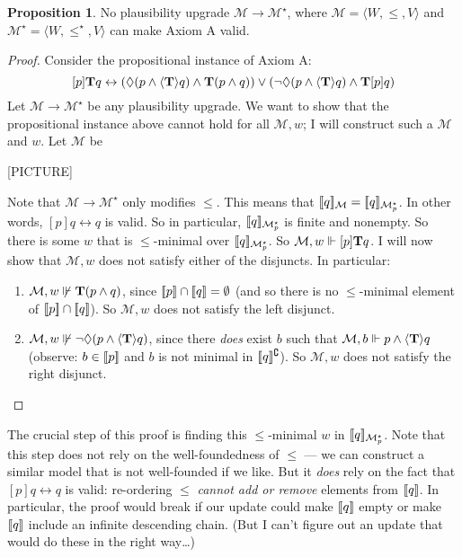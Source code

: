 \documentclass[letterpaper]{article}
\theoremstyle{definition}
\newtheorem{proposition}{Proposition}
\newcommand{\semantics}[1]{[\![\mbox{\em $ #1 $\/}]\!]}
\newcommand{\Model}{\mathcal{M}}
\newcommand{\Typ}[1]{\textrm{\textup{\textbf{T}}} #1}
\newcommand{\Update}[1]{[#1]}
\newcommand{\diaTyp}[1]{\langle \textrm{\textup{\textbf{T}}} \rangle #1}
\begin{document}
\begin{proposition}
    No plausibility upgrade $\Model \to \Model^\star$,  where $\Model = \langle W, \leq, V \rangle$ and $\Model^\star = \langle W, \leq^\star, V \rangle$ can make Axiom A valid.
\end{proposition}
\begin{proof}
    Consider the propositional instance of Axiom A:
    \[
        \Update{p} \Typ{q} \leftrightarrow 
        (\Diamond(p \land \diaTyp{q}) \land \Typ{(p \land q)}) \lor (\neg \Diamond(p \land \diaTyp{q}) \land \Typ{\Update{p} q})
    \]
    Let $\Model \to \Model^\star$ be any plausibility upgrade.  We want to show that the propositional instance above cannot hold for all $\Model, w$; I will construct such a $\Model$ and $w$.  Let $\Model$ be
    
    [PICTURE]

    Note that $\Model \to \Model^\star$ only modifies $\leq$.  This means that $\semantics{q}_\Model = \semantics{q}_{\Model^\star_p}$.  In other words, $\Update{p} q \leftrightarrow q$ is valid.  So in particular, $\semantics{q}_{\Model^\star_p}$ is finite and nonempty.  So there is some $w$ that is ${\leq}$-minimal over $\semantics{q}_{\Model^\star_p}$.  So $\Model, w \Vdash \Update{p} \Typ{q}$.  I will now show that $\Model, w$ does not satisfy either of the disjuncts.  In particular:
    \begin{enumerate}
        \item $\Model, w \not \Vdash \Typ{(p \land q)}$, since $\semantics{p} \cap \semantics{q} = \emptyset$ (and so there is no ${\leq}$-minimal element of $\semantics{p} \cap \semantics{q}$).  So $\Model, w$ does not satisfy the left disjunct.
        
        \item $\Model, w \not \Vdash \neg\Diamond(p \land \diaTyp{q})$, since there \emph{does} exist $b$ such that $\Model, b \Vdash p \land \diaTyp{q}$ (observe: $b \in \semantics{p}$ and $b$ is not minimal in $\semantics{q}^\complement$).  So $\Model, w$ does not satisfy the right disjunct.\qedhere
    \end{enumerate}
\end{proof}

The crucial step of this proof is finding this ${\leq}$-minimal $w$ in $\semantics{q}_{\Model^\star_p}$.  Note that this step does not rely on the well-foundedness of $\leq$ --- we can construct a similar model that is not well-founded if we like.  But it \emph{does} rely on the fact that $\Update{p} q \leftrightarrow q$ is valid: re-ordering $\leq$ \emph{cannot add or remove} elements from $\semantics{q}$.  In particular, the proof would break if our update could make $\semantics{q}$ empty or make $\semantics{q}$ include an infinite descending chain.  (But I can't figure out an update that would do these in the right way\ldots)
\end{document}
